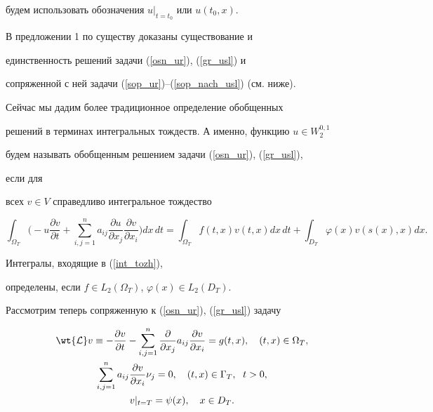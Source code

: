 будем использовать обозначения $u|_{t=t_0}$ или $u(t_0,x)$.





В предложении 1 по существу доказаны существование и


единственность решений задачи (\ref{osn_ur}), (\ref{gr_usl}) и


сопряженной с ней задачи (\ref{sop_ur})--(\ref{sop_nach_usl}) (см. ниже).


Сейчас мы дадим более традиционное определение обобщенных


решений в терминах интегральных тождеств. А именно, функцию $u\in W_2^{0,1}$


будем называть обобщенным решением задачи (\ref{osn_ur}), (\ref{gr_usl}),


если для


всех $v \in V$ справедливо интегральное тождество


\begin{equation}


\label{int_tozh}


\int_{\Omega_T}\bigg(-u\frac{\partial v}{\partial t} +\sum_{i,j=1}^n


a_{ij} \frac{\partial u}{\partial x_j} \frac{\partial v}{\partial x_i}


\bigg)dx\,dt=


\int_{\Omega_T}f(t,x)v(t,x)dx\,dt+


\int_{D_T}\varphi(x)v(s(x),x)dx.


\end{equation}


Интегралы, входящие в (\ref{int_tozh}), 


определены, если $f\in L_2(\Omega_T)$, $\varphi(x) \in L_2(D_T)$.





Рассмотрим теперь сопряженную к (\ref{osn_ur}), (\ref{gr_usl}) задачу


\begin{gather}


\wt{\cal L}v \equiv -\frac{\partial v}{\partial t}-


\sum_{i,j=1}^n \frac{\partial }{\partial x_j} a_{ij} 


\frac{\partial v}{\partial x_i} = g(t,x),


\quad (t,x) \in \Omega_T, \label{sop_ur}\\


%


\sum_{i,j=1}^n a_{ij}\frac{\partial v}{\partial x_i} \nu_j =0,\quad


(t,x)\in \Gamma_T, \ \; t>0, \label{sop_gr_usl}\\


%


v|_{t=T}=\psi(x), \quad x \in D_T.\label{sop_nach_usl}


\end{gather} 


